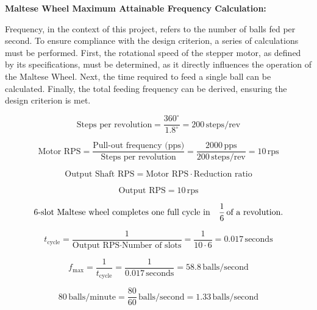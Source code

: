 \documentclass[12pt]{article}
\begin{document}
\textbf{Maltese Wheel Maximum Attainable Frequency Calculation:}

Frequency, in the context of this project, refers to the number of balls fed per second. To ensure compliance with the design criterion, a series of calculations must be performed. First, the rotational speed of the stepper motor, as defined by its specifications, must be determined, as it directly influences the operation of the Maltese Wheel. Next, the time required to feed a single ball can be calculated. Finally, the total feeding frequency can be derived, ensuring the design criterion is met.


\begin{equation}
\text{Steps per revolution} = \frac{360^\circ}{1.8^\circ} = 200 \, \text{steps/rev}
\end{equation}

\begin{equation}
\text{Motor RPS} = \frac{\text{Pull-out frequency (pps)}}{\text{Steps per revolution}} = \frac{2000 \, \text{pps}}{200 \, \text{steps/rev}} = 10 \, \text{rps}
\end{equation}

\begin{equation}
\text{Output Shaft RPS} = \text{Motor RPS} \cdot \text{Reduction ratio}
\end{equation}

\begin{equation}
\text{Output RPS} = 10 \, \text{rps}
\end{equation}

\begin{equation}
\text{6-slot Maltese wheel completes one full cycle in} \quad \frac{1}{6} \, \text{of a revolution.}\notag
\end{equation}

\begin{equation}
t_{\text{cycle}} = \frac{1}{\text{Output RPS} \cdot \text{Number of slots}} = \frac{1}{10 \cdot 6} = 0.017 \, \text{seconds}
\end{equation}

\begin{equation}
f_{\text{max}} = \frac{1}{t_{\text{cycle}}} = \frac{1}{0.017 \, \text{seconds}} = 58.8 \, \text{balls/second}
\end{equation}

\begin{equation}
80 \, \text{balls/minute} = \frac{80}{60} \, \text{balls/second} = 1.33 \, \text{balls/second}
\end{equation}
\end{document}

